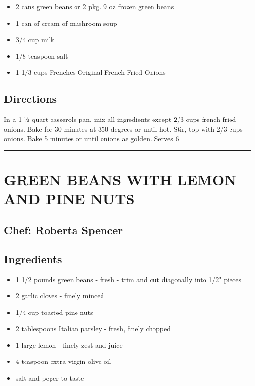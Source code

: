 \documentclass[
]{book}
\providecommand{\tightlist}{%
  \setlength{\itemsep}{0pt}\setlength{\parskip}{0pt}}
\begin{document}
\begin{itemize}
\tightlist
\item
  2 cans green beans or 2 pkg. 9 oz frozen green beans
\item
  1 can of cream of mushroom soup
\item
  3/4 cup milk
\item
  1/8 teaspoon salt
\item
  1 1/3 cups Frenches Original French Fried Onions
\end{itemize}

\hypertarget{directions-31}{%
\subsection*{Directions}\label{directions-31}}


In a 1 ½ quart casserole pan, mix all ingredients except 2/3 cups french fried onions.
Bake for 30 minutes at 350 degrees or until hot. Stir, top with 2/3 cups onions.
Bake 5 minutes or until onions ae golden. Serves 6

\begin{center}\rule{0.5\linewidth}{0.5pt}\end{center}

\hypertarget{green-beans-with-lemon-and-pine-nuts}{%
\section*{GREEN BEANS WITH LEMON AND PINE NUTS}\label{green-beans-with-lemon-and-pine-nuts}}


\hypertarget{chef-roberta-spencer-7}{%
\subsection*{Chef: Roberta Spencer}\label{chef-roberta-spencer-7}}


\hypertarget{ingredients-32}{%
\subsection*{Ingredients}\label{ingredients-32}}


\begin{itemize}
\tightlist
\item
  1 1/2 pounds green beans - fresh - trim and cut diagonally into 1/2" pieces
\item
  2 garlic cloves - finely minced
\item
  1/4 cup toasted pine nuts
\item
  2 tablespoons Italian parsley - fresh, finely chopped
\item
  1 large lemon - finely zest and juice
\item
  4 teaspoon extra-virgin olive oil
\item
  salt and peper to taste
\end{itemize}
\end{document}
